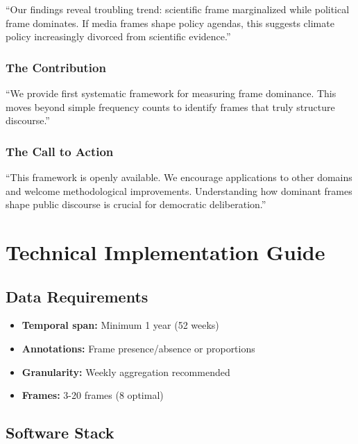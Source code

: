 \documentclass[11pt]{article}
\begin{document}
``Our findings reveal troubling trend: scientific frame marginalized while political frame dominates. If media frames shape policy agendas, this suggests climate policy increasingly divorced from scientific evidence.''

\subsubsection{The Contribution}

``We provide first systematic framework for measuring frame dominance. This moves beyond simple frequency counts to identify frames that truly structure discourse.''

\subsubsection{The Call to Action}

``This framework is openly available. We encourage applications to other domains and welcome methodological improvements. Understanding how dominant frames shape public discourse is crucial for democratic deliberation.''

\section{Technical Implementation Guide}

\subsection{Data Requirements}

\begin{tcolorbox}[mybox={Minimum Requirements}]
\begin{itemize}
    \item \textbf{Temporal span:} Minimum 1 year (52 weeks)
    \item \textbf{Annotations:} Frame presence/absence or proportions
    \item \textbf{Granularity:} Weekly aggregation recommended
    \item \textbf{Frames:} 3-20 frames (8 optimal)
\end{itemize}
\end{tcolorbox}

\subsection{Software Stack}
\end{document}
